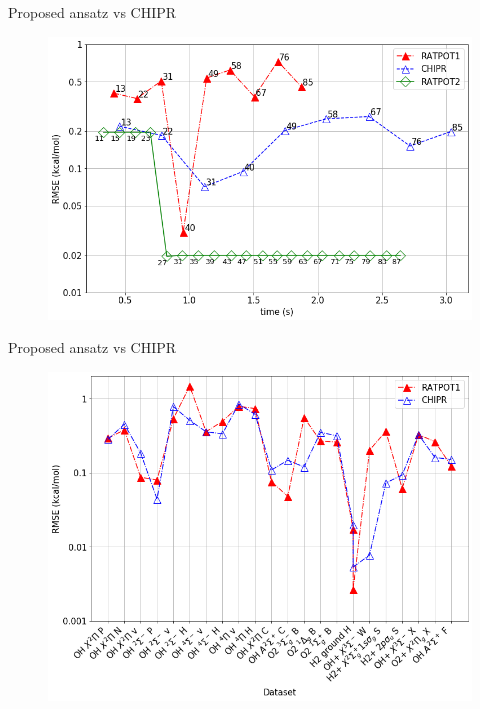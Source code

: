 \documentclass{beamer}
\begin{document}
\begin{frame}{Proposed ansatz vs CHIPR}
    \begin{figure}[h]
        \includegraphics[scale=0.35]{img/slide/performance_ansatz0_vs_chipr_vs_ansatz2.png}
        \label{fig:perform}
    \end{figure}
\end{frame}
\begin{frame}{Proposed ansatz vs CHIPR}
    \begin{figure}[h]
        \includegraphics[scale=0.32]{img/slide/dataset_ansatz0_vs_chipr_v2.png}
        \label{fig:perform2}
    \end{figure}
\end{frame}
\end{document}
